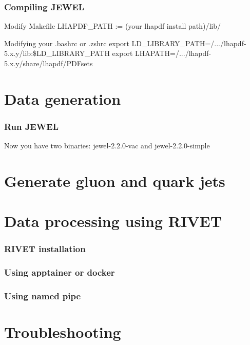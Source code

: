\documentclass{beamer}
\begin{document}
\begin{frame}
 \frametitle{Compiling JEWEL}
 \begin{block}{Modify Makefile}
 LHAPDF\_PATH := (your lhapdf install path)/lib/
 \end{block}

 \begin{block}{Modifying your .bashrc or .zshrc}
 export LD\_LIBRARY\_PATH=/.../lhapdf-5.x.y/lib:\$LD\_LIBRARY\_PATH
 export LHAPATH=/.../lhapdf-5.x.y/share/lhapdf/PDFsets
 \end{block}
\end{frame}


\section{Data generation}
\begin{frame}
\frametitle{Run JEWEL}
Now you have two binaries: jewel-2.2.0-vac and jewel-2.2.0-simple
\end{frame}

\section{Generate gluon and quark jets}

\section{Data processing using RIVET}

\begin{frame}
 \frametitle{RIVET installation}
\end{frame}

\begin{frame}
 \frametitle{Using apptainer or docker}
\end{frame}


\begin{frame}
 \frametitle{Using named pipe}
\end{frame}


\section{Troubleshooting}
\end{document}

